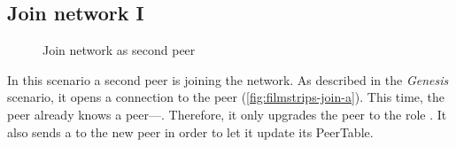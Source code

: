\subsection{Join network I}

\begin{figure}[htb!]
  \centering
	\caption{Join network as second peer}
\label{fig:filmstrips-join}
\end{figure}

In this scenario a second peer is joining the network. As described in the \textit{Genesis} scenario, it opens a connection to the \signal peer (\vref{fig:filmstrips-join-a}). This time, the \signal peer already knows a \router peer—\alice. Therefore, it only upgrades the \newbie peer to the role \peer. It also sends a \peerUpdate to the new peer in order to let it update its PeerTable. 

